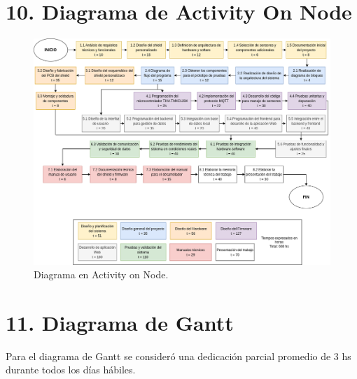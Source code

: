 \documentclass[
11pt, %
]{charter}
\begin{document}
\newpage
\section{10. Diagrama de Activity On Node}
\label{sec:AoN}

\begin{figure}[htpb]
	\centering 
	\includegraphics[width=1.0\textwidth]{./Figuras/AoN.png}
	\caption{Diagrama en Activity on Node.}
	\label{fig:AoN}
\end{figure}
\newpage
\section{11. Diagrama de Gantt}
\label{sec:gantt}

Para el diagrama de Gantt se consideró una dedicación parcial promedio de 3 hs durante todos los días hábiles.
\end{document}
